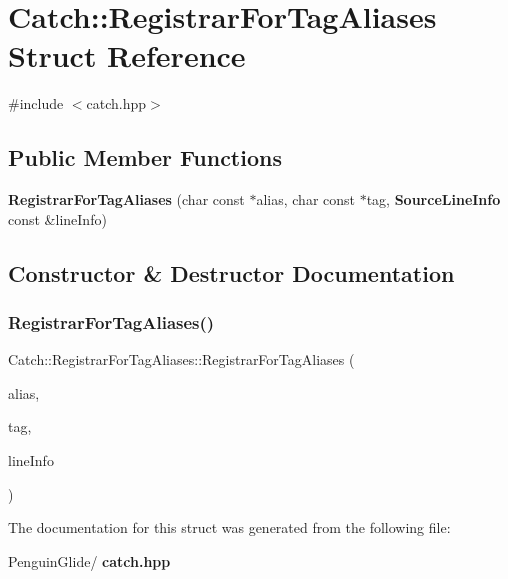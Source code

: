 \section{Catch\+::Registrar\+For\+Tag\+Aliases Struct Reference}
\label{struct_catch_1_1_registrar_for_tag_aliases}


{\ttfamily \#include $<$catch.\+hpp$>$}

\subsection*{Public Member Functions}
\begin{DoxyCompactItemize}
\item 
\textbf{ Registrar\+For\+Tag\+Aliases} (char const $\ast$alias, char const $\ast$tag, \textbf{ Source\+Line\+Info} const \&line\+Info)
\end{DoxyCompactItemize}


\subsection{Constructor \& Destructor Documentation}
\mbox{\label{struct_catch_1_1_registrar_for_tag_aliases_ae4e45830e4763bcd65d55d8db9167b69}} 
\subsubsection{RegistrarForTagAliases()}
{\footnotesize\ttfamily Catch\+::\+Registrar\+For\+Tag\+Aliases\+::\+Registrar\+For\+Tag\+Aliases (\begin{DoxyParamCaption}\item[{char const $\ast$}]{alias,  }\item[{char const $\ast$}]{tag,  }\item[{\textbf{ Source\+Line\+Info} const \&}]{line\+Info }\end{DoxyParamCaption})}



The documentation for this struct was generated from the following file\+:\begin{DoxyCompactItemize}
\item 
Penguin\+Glide/\textbf{ catch.\+hpp}\end{DoxyCompactItemize}
